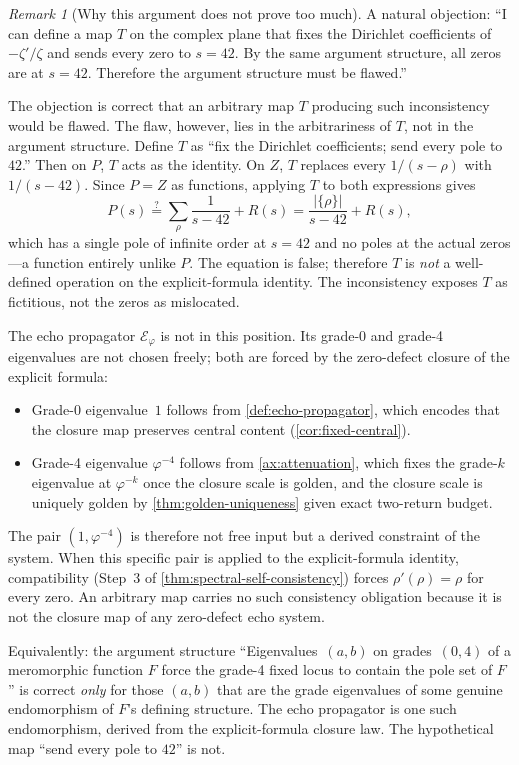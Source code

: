 \documentclass[11pt,a4paper]{article}
\theoremstyle{plain}
\theoremstyle{definition}
\theoremstyle{remark}
\newtheorem{remark}[theorem]{Remark}
\numberwithin{equation}{section}
\newcommand{\vp}{\varphi}
\begin{document}
\begin{remark}[Why this argument does not prove too much]
\label{rmk:not-arbitrary-map}
A natural objection: ``I can define a map \(T\) on the complex
plane that fixes the Dirichlet coefficients of \(-\zeta'/\zeta\)
and sends every zero to \(s=42\).  By the same argument structure,
all zeros are at \(s=42\).  Therefore the argument structure must
be flawed.''

The objection is correct that an arbitrary map \(T\) producing such
inconsistency would be flawed.  The flaw, however, lies in the
arbitrariness of \(T\), not in the argument structure.  Define
\(T\) as ``fix the Dirichlet coefficients; send every pole to
\(42\).''  Then on \(P\), \(T\) acts as the identity.  On \(Z\),
\(T\) replaces every \(1/(s-\rho)\) with \(1/(s-42)\).  Since
\(P=Z\) as functions, applying \(T\) to both expressions gives
\[
  P(s) \stackrel{?}{=} \sum_\rho \frac{1}{s-42} + R(s)
       = \frac{|\{\rho\}|}{s-42} + R(s),
\]
which has a single pole of infinite order at \(s=42\) and no
poles at the actual zeros---a function entirely unlike \(P\).
The equation is false; therefore \(T\) is \emph{not} a
well-defined operation on the explicit-formula identity.  The
inconsistency exposes \(T\) as fictitious, not the zeros as
mislocated.

The echo propagator \(\mathcal{E}_\vp\) is not in this position.
Its grade-0 and grade-4 eigenvalues are not chosen freely; both
are forced by the zero-defect closure of the explicit formula:
\begin{itemize}
  \item Grade-0 eigenvalue~\(1\) follows from
    \cref{def:echo-propagator}, which encodes that the closure map
    preserves central content (\cref{cor:fixed-central}).
  \item Grade-4 eigenvalue \(\vp^{-4}\) follows from
    \cref{ax:attenuation}, which fixes the
    grade-\(k\) eigenvalue at \(\vp^{-k}\) once the closure scale
    is golden, and the closure scale is uniquely golden by
    \cref{thm:golden-uniqueness} given exact two-return budget.
  \end{itemize}
The pair \((1,\vp^{-4})\) is therefore not free input but a derived
constraint of the system.  When this specific pair is applied to
the explicit-formula identity, compatibility (Step~3 of
\cref{thm:spectral-self-consistency}) forces \(\rho'(\rho)=\rho\)
for every zero.  An arbitrary map carries no such consistency
obligation because it is not the closure map of any zero-defect
echo system.

Equivalently: the argument structure ``Eigenvalues~\((a,b)\) on
grades~\((0,4)\) of a meromorphic function \(F\) force the
grade-4 fixed locus to contain the pole set of \(F\)'' is correct
\emph{only} for those \((a,b)\) that are the grade eigenvalues of
some genuine endomorphism of \(F\)'s defining structure.  The
echo propagator is one such endomorphism, derived from the
explicit-formula closure law.  The hypothetical map ``send every
pole to \(42\)'' is not.
\end{remark}
\end{document}
